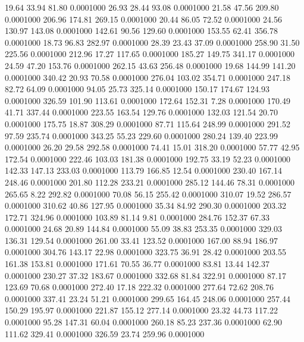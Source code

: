   19.64   33.94   81.80   0.0001000
  26.93   28.44   93.08   0.0001000
  21.58   47.56  209.80   0.0001000
 206.96  174.81  269.15   0.0001000
  20.44   86.05   72.52   0.0001000
  24.56  130.97  143.08   0.0001000
 142.61   90.56  129.60   0.0001000
 153.55   62.41  356.78   0.0001000
  18.73   96.83  282.97   0.0001000
  28.39   23.43   37.09   0.0001000
 258.90   31.50  225.56   0.0001000
 212.96   17.27  117.65   0.0001000
 185.27  149.75  341.17   0.0001000
  24.59   47.20  153.76   0.0001000
 262.15   43.63  256.48   0.0001000
  19.68  144.99  141.20   0.0001000
 340.42   20.93   70.58   0.0001000
 276.04  103.02  354.71   0.0001000
 247.18   82.72   64.09   0.0001000
  94.05   25.73  325.14   0.0001000
 150.17  174.67  124.93   0.0001000
 326.59  101.90  113.61   0.0001000
 172.64  152.31    7.28   0.0001000
 170.49   41.71  337.44   0.0001000
 223.55  163.54  129.76   0.0001000
 132.03  121.54   20.70   0.0001000
 175.75   18.87  308.29   0.0001000
  87.71  115.64  248.99   0.0001000
 291.52   97.59  235.74   0.0001000
 343.25   55.23  229.60   0.0001000
 280.24  139.40  223.99   0.0001000
  26.20   29.58  292.58   0.0001000
  74.41   15.01  318.20   0.0001000
  57.77   42.95  172.54   0.0001000
 222.46  103.03  181.38   0.0001000
 192.75   33.19   52.23   0.0001000
 142.33  147.13  233.03   0.0001000
 113.79  166.85   12.54   0.0001000
 230.40  167.14  248.46   0.0001000
 201.80  112.28  233.21   0.0001000
 285.12  144.46   78.31   0.0001000
 265.65    8.22  292.82   0.0001000
  70.08   56.15  255.42   0.0001000
 310.07   19.52  286.57   0.0001000
 310.62   40.86  127.95   0.0001000
  35.34   84.92  290.30   0.0001000
 203.32  172.71  324.96   0.0001000
 103.89   81.14    9.81   0.0001000
 284.76  152.37   67.33   0.0001000
  24.68   20.89  144.84   0.0001000
  55.09   38.83  253.35   0.0001000
 329.03  136.31  129.54   0.0001000
 261.00   33.41  123.52   0.0001000
 167.00   88.94  186.97   0.0001000
 304.76  143.17   22.98   0.0001000
 323.75   36.91   28.42   0.0001000
 203.55  161.38  153.81   0.0001000
 171.61   70.55   36.77   0.0001000
  83.81   13.44  142.37   0.0001000
 230.27   37.32  183.67   0.0001000
 332.68   81.84  322.91   0.0001000
  87.17  123.69   70.68   0.0001000
 272.40   17.18  222.32   0.0001000
 277.64   72.62  208.76   0.0001000
 337.41   23.24   51.21   0.0001000
 299.65  164.45  248.06   0.0001000
 257.44  150.29  195.97   0.0001000
 221.87  155.12  277.14   0.0001000
  23.32   44.73  117.22   0.0001000
  95.28  147.31   60.04   0.0001000
 260.18   85.23  237.36   0.0001000
  62.90  111.62  329.41   0.0001000
 326.59   23.74  259.96   0.0001000
